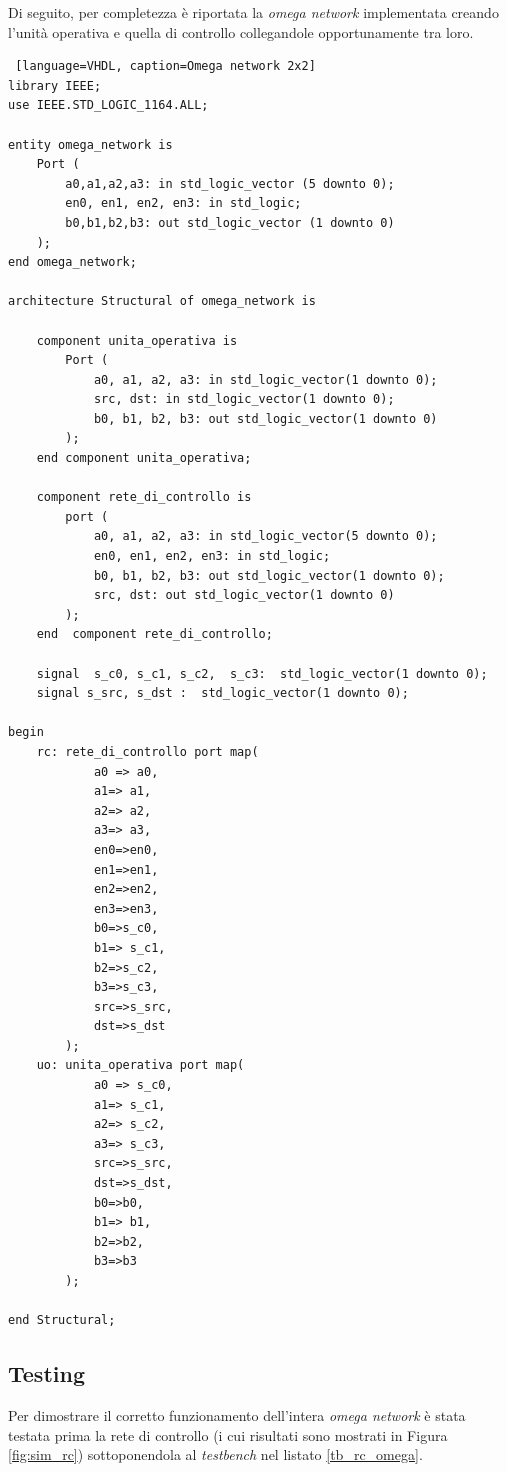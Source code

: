 Di seguito, per completezza è riportata la \textit{omega network} implementata creando l'unità operativa e quella di controllo collegandole opportunamente tra loro.
\begin{lstlisting} [language=VHDL, caption=Omega network 2x2]
library IEEE;
use IEEE.STD_LOGIC_1164.ALL;

entity omega_network is
    Port (
        a0,a1,a2,a3: in std_logic_vector (5 downto 0);
        en0, en1, en2, en3: in std_logic;
        b0,b1,b2,b3: out std_logic_vector (1 downto 0)
    );
end omega_network;

architecture Structural of omega_network is

    component unita_operativa is
        Port (
            a0, a1, a2, a3: in std_logic_vector(1 downto 0);
            src, dst: in std_logic_vector(1 downto 0);
            b0, b1, b2, b3: out std_logic_vector(1 downto 0)
        );
    end component unita_operativa;

    component rete_di_controllo is
        port (
            a0, a1, a2, a3: in std_logic_vector(5 downto 0);
            en0, en1, en2, en3: in std_logic;
            b0, b1, b2, b3: out std_logic_vector(1 downto 0);
            src, dst: out std_logic_vector(1 downto 0)
        );
    end  component rete_di_controllo;

    signal  s_c0, s_c1, s_c2,  s_c3:  std_logic_vector(1 downto 0);
    signal s_src, s_dst :  std_logic_vector(1 downto 0);

begin
    rc: rete_di_controllo port map(
            a0 => a0,
            a1=> a1,
            a2=> a2,
            a3=> a3,
            en0=>en0,
            en1=>en1,
            en2=>en2,
            en3=>en3,
            b0=>s_c0,
            b1=> s_c1,
            b2=>s_c2,
            b3=>s_c3,
            src=>s_src,
            dst=>s_dst
        );
    uo: unita_operativa port map(
            a0 => s_c0,
            a1=> s_c1,
            a2=> s_c2,
            a3=> s_c3,
            src=>s_src,
            dst=>s_dst,
            b0=>b0,
            b1=> b1,
            b2=>b2,
            b3=>b3
        );

end Structural;
\end{lstlisting}

\subsection{Testing}
Per dimostrare il corretto funzionamento dell'intera \textit{omega network} è stata testata prima la rete di controllo (i cui risultati sono mostrati in Figura \ref{fig:sim_rc}) sottoponendola al \textit{testbench} nel listato \ref{tb_rc_omega}.

